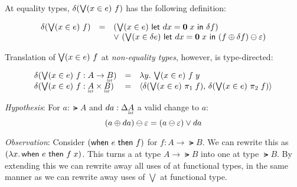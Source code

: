 \documentclass{article}
\begin{document}
At equality types, $\delta(\textstyle\bigvee({x \in e})\  f)$ has the following definition:

\[\begin{array}{rcl}
  \delta(\textstyle\bigvee({x \in e})\  f)
  &=& (\textstyle\bigvee({x \in e})\  \mathsf{let}~dx = \mathbf{0}\; x ~\mathsf{in}~ \delta f)
  \\ && \vee~ (\textstyle\bigvee({x \in \delta e})\  \mathsf{let}~dx = \mathbf{0}\; x ~\mathsf{in}~
    (f \oplus \delta f) \ominus \varepsilon)
\end{array}\]

Translation of $\textstyle\bigvee({x \in e})\  f$ at \emph{non-equality types}, however, is
type-directed:

\[\begin{array}{lcll}
  \delta(\downelim{x}{e}{f} : A \to \lat{B})
  &=& \fn\bind{y} \downelim{x}{e}{f\; y}\\
  \delta(\downelim{x}{e}{f} : \lat{A} \x \lat{B})
  &=& \pair{\delta(\downelim{x}{e}{\pi_1\; f})}
  {\delta(\downelim{x}{e}{\pi_2\; f})}
\end{array}\]

\emph{Hypothesis}: For $a : \lat{A}$ and $da : \GD\lat{A}$ a valid change to
$a$:
\begin{equation*}
  (a \oplus da) \ominus \varepsilon = (a \ominus \varepsilon)
  \vee da
\end{equation*}

\emph{Observation}: Consider $(\mathsf{when}~{e}~\mathsf{then}~{f})$ for $f : A \to \lat{B}$. We can
rewrite this as $(\lambda x.\, \mathsf{when}~{e}~\mathsf{then}~{f\; x})$. This turns a  at type
$A \to \lat{B}$ into one at type $\lat{B}$. By extending this we can rewrite
away all uses of  at functional types, in the same manner as we can
rewrite away uses of $\bigvee$ at functional type.

\end{document}
